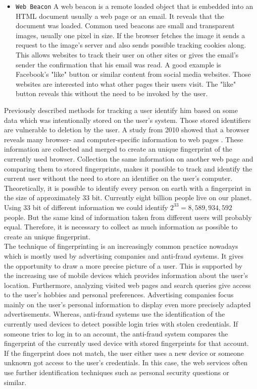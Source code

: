 \begin{itemize}
		\item \texttt{Web Beacon} A web beacon is a remote loaded object that is embedded into an HTML document usually a web page or an email. It reveals that the document was loaded. Common used beacons are small and transparent images, usually one pixel in size. If the browser fetches the image it sends a request to the image's server and also sends possible tracking cookies along. This allows websites to track their user on other sites or gives the email's sender the confirmation that his email was read. A good example is Facebook's "like" button or similar content from social media websites. Those websites are interested into what other pages their users visit. The "like" button reveals this without the need to be invoked by the user. 
	\end{itemize}
	
	Previously described methods for tracking a user identify him based on some data which was intentionally stored on the user's system. Those stored identifiers are vulnerable to deletion by the user. A study from 2010 showed that a browser reveals many browser- and computer-specific information to web pages \cite{Eckersley:2010:UYW:1881151.1881152}. These information are collected and merged to create an unique fingerprint of the currently used browser. Collection the same information on another web page and comparing them to stored fingerprints, makes it possible to track and identify the current user without the need to store an identifier on the user's computer. Theoretically, it is possible to identify every person on earth with a fingerprint in the size of approximately 33 bit. Currently eight billion people live on our planet. Using 33 bit of different information we could identify $2^{33}=8,589,934,592$ people. But the same kind of information taken from different users will probably equal. Therefore, it is necessary to collect as much information as possible to create an unique fingerprint. \\
	
	The technique of fingerprinting is an increasingly common practice nowadays which is mostly used by advertising companies and anti-fraud systems. It gives the opportunity to draw a more precise picture of a user. This is supported by the increasing use of mobile devices which provides information about the user's location. Furthermore, analyzing visited web pages and search queries give access to the user's hobbies and personal preferences. Advertising companies focus mainly on the user's personal information to display even more precisely adapted advertisements. Whereas, anti-fraud systems use the identification of the currently used devices to detect possible login tries with stolen credentials. If someone tries to log in to an account, the anti-fraud system compares the fingerprint of the currently used device with stored fingerprints for that account. If the fingerprint does not match, the user either uses a new device or someone unknown got access to the user's credentials. In this case, the web services often use further identification techniques such as personal security questions or similar. \\
	
